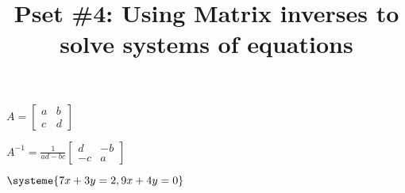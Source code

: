 \documentclass{exam}
\title{Pset \#4: Using Matrix inverses to solve systems of equations  }
\author{  }
\begin{document}
\maketitle
\thispagestyle{empty}



$
A =
\begin{bmatrix}
a & b \\
c & d
\end{bmatrix}
$

$
A^{-1} = \frac{1}{ad -bc}
\begin{bmatrix}
d & -b \\
-c &  a
\end{bmatrix}
$
\vspace{1cm}

$
\systeme{
7x + 3y = 2,
9x + 4y = 0
}
$
\end{document}
